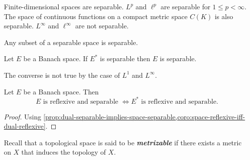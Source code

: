 \documentclass{article}
\theoremstyle{definition}
\numberwithin{equation}{section}
\begin{document}
	Finite-dimensional spaces are separable. $L^p$ and $\ell^p$ are separable for $1\leq p<\infty$. The space of continuous functions on a compact metric space $C(K)$ is also separable. $L^\infty$ and $\ell^\infty$ are not separable.
	
	\begin{prop}
		Any subset of a separable space is separable.
	\end{prop}
	\begin{prop}\label{prop:dual-separable-implies-space-separable}
		Let $E$ be a Banach space. If $E^*$ is separable then $E$ is separable.
	\end{prop}
	\begin{remark}
		The converse is not true by the case of $L^1$ and $L^\infty$.
	\end{remark}
	\begin{coro}
		Let $E$ be a Banach space. Then
		\[E \text{ is reflexive and separable }\iff E^*\text{ is reflexive and separable}.\]
	\end{coro}
	\begin{proof}
		Using \cref{prop:dual-separable-implies-space-separable,coro:space-reflexive-iff-dual-reflexive}.
	\end{proof}
	Recall that a topological space is said to be \textbf{\textit{metrizable}} if there exists a metric on $X$ that induces the topology of $X$.
	
\end{document}
